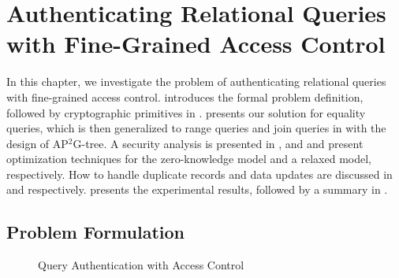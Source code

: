 \chapter{Authenticating Relational Queries with Fine-Grained Access Control}\label{chap:access-control}

In this chapter, we investigate the problem of authenticating relational queries with fine-grained access control.  introduces the formal problem definition, followed by cryptographic primitives in .  presents our solution for equality queries, which is then generalized to range queries and join queries in  with the design of AP$^2$G-tree. A security analysis is presented in , and  and  present optimization techniques for the zero-knowledge model and a relaxed model, respectively. How to handle duplicate records and data updates are discussed in  and  respectively.  presents the experimental results, followed by a summary in .

\section{Problem Formulation}\label{sec:access-control:problem}

\begin{figure}[t]
  \centering
  \resizebox{\linewidth}{!}{}
  \caption{Query Authentication with Access Control}\label{fig:access-control:model}
\end{figure}

